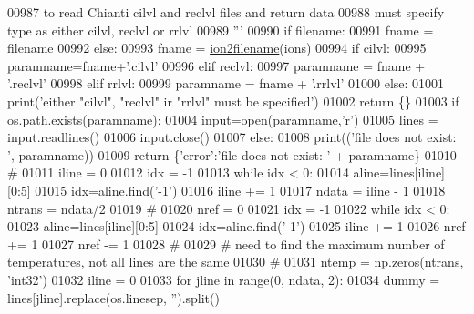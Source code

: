 \begin{DoxyCode}
{{{{{{{{{{{{00987 \textcolor{stringliteral}{    to read Chianti cilvl and reclvl files and return data}
00988 \textcolor{stringliteral}{    must specify type as either cilvl, reclvl or rrlvl}
00989 \textcolor{stringliteral}{    '''}
00990     \textcolor{keywordflow}{if} filename:
00991         fname = filename
00992     \textcolor{keywordflow}{else}:
00993         fname = \hyperlink{namespacepyneb_1_1utils_1_1__chianti__tools_ad4bc7b577fd4c3819ceb00b0a444351b}{ion2filename}(ions)
00994     \textcolor{keywordflow}{if} cilvl:
00995         paramname=fname+\textcolor{stringliteral}{'.cilvl'}
00996     \textcolor{keywordflow}{elif} reclvl:
00997         paramname = fname + \textcolor{stringliteral}{'.reclvl'}
00998     \textcolor{keywordflow}{elif} rrlvl:
00999         paramname = fname + \textcolor{stringliteral}{'.rrlvl'}
01000     \textcolor{keywordflow}{else}:
01001         print(\textcolor{stringliteral}{'either "cilvl", "reclvl" ir "rrlvl" must be specified'})
01002         \textcolor{keywordflow}{return} \{\}
01003     \textcolor{keywordflow}{if} os.path.exists(paramname):
01004         input=open(paramname,\textcolor{stringliteral}{'}\textcolor{stringliteral}{r')}
01005 \textcolor{stringliteral}{        lines = input.readlines()}
01006 \textcolor{stringliteral}{        input.close()}
01007 \textcolor{stringliteral}{    }\textcolor{keywordflow}{else}:
01008         print((\textcolor{stringliteral}{'file does not exist:  '}, paramname))
01009         \textcolor{keywordflow}{return} \{\textcolor{stringliteral}{'error'}:\textcolor{stringliteral}{'file does not exist: '} + paramname\}
01010     \textcolor{comment}{#}
01011     iline = 0
01012     idx = -1
01013     \textcolor{keywordflow}{while} idx < 0:
01014         aline=lines[iline][0:5]
01015         idx=aline.find(\textcolor{stringliteral}{'-1'})
01016         iline += 1
01017     ndata = iline - 1
01018     ntrans = ndata/2
01019     \textcolor{comment}{#}
01020     nref = 0
01021     idx = -1
01022     \textcolor{keywordflow}{while} idx < 0:
01023         aline=lines[iline][0:5]
01024         idx=aline.find(\textcolor{stringliteral}{'-1'})
01025         iline += 1
01026         nref += 1
01027     nref -= 1
01028     \textcolor{comment}{#}
01029     \textcolor{comment}{# need to find the maximum number of temperatures, not all lines are the same}
01030     \textcolor{comment}{#}
01031     ntemp = np.zeros(ntrans, \textcolor{stringliteral}{'int32'})
01032     iline = 0
01033     \textcolor{keywordflow}{for} jline \textcolor{keywordflow}{in} range(0, ndata, 2):
01034         dummy = lines[jline].replace(os.linesep, \textcolor{stringliteral}{''}).split()
}}}}}}}}}}}}
\end{DoxyCode}
